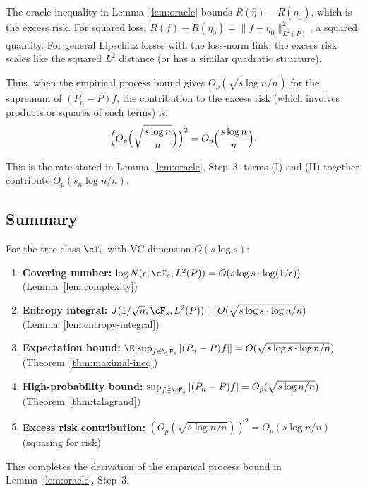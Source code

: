 The oracle inequality in Lemma~\ref{lem:oracle} bounds $R(\hat\eta) - R(\eta_0)$, which is the excess risk. For squared loss, $R(f) - R(\eta_0) = \|f - \eta_0\|_{L^2(P)}^2$, a squared quantity. For general Lipschitz losses with the loss-norm link, the excess risk scales like the squared $L^2$ distance (or has a similar quadratic structure).

Thus, when the empirical process bound gives $O_p(\sqrt{s \log n / n})$ for the supremum of $(P_n - P)f$, the contribution to the excess risk (which involves products or squares of such terms) is:
\[
\Bigl( O_p\Bigl(\sqrt{\frac{s \log n}{n}}\Bigr) \Bigr)^2 = O_p\Bigl( \frac{s \log n}{n} \Bigr).
\]

This is the rate stated in Lemma~\ref{lem:oracle}, Step~3: terms (I) and (II) together contribute $O_p(s_n \log n / n)$.

\subsection{Summary}

For the tree class $\cT_s$ with VC dimension $O(s \log s)$:
\begin{enumerate}
\item \textbf{Covering number:} $\log N(\epsilon, \cT_s, L^2(P)) = O(s \log s \cdot \log(1/\epsilon))$ (Lemma~\ref{lem:complexity})
\item \textbf{Entropy integral:} $J(1/\sqrt{n}, \cF_s, L^2(P)) = O(\sqrt{s \log s \cdot \log n / n})$ (Lemma~\ref{lem:entropy-integral})
\item \textbf{Expectation bound:} $\E[\sup_{f \in \cF_s} |(P_n - P)f|] = O(\sqrt{s \log s \cdot \log n / n})$ (Theorem~\ref{thm:maximal-ineq})
\item \textbf{High-probability bound:} $\sup_{f \in \cF_s} |(P_n - P)f| = O_p(\sqrt{s \log n / n})$ (Theorem~\ref{thm:talagrand})
\item \textbf{Excess risk contribution:} $(O_p(\sqrt{s \log n / n}))^2 = O_p(s \log n / n)$ (squaring for risk)
\end{enumerate}

This completes the derivation of the empirical process bound in Lemma~\ref{lem:oracle}, Step~3.
